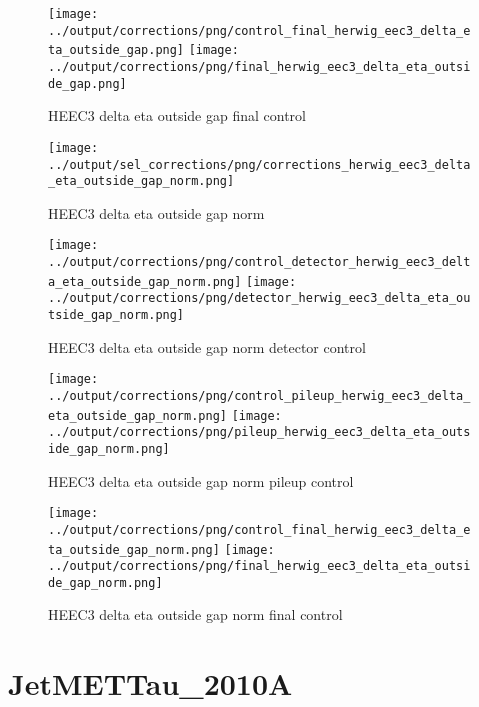 \documentclass[11pt]{book}
\begin{document}
\begin{figure}[ht]
\centering
\texttt{[image: ../output/corrections/png/control\_final\_herwig\_eec3\_delta\_eta\_outside\_gap.png]}
\texttt{[image: ../output/corrections/png/final\_herwig\_eec3\_delta\_eta\_outside\_gap.png]}
\caption{HEEC3 delta eta outside gap final control}
\label{fig:HEEC3_delta_etat_outside_gap_final_control}
\end{figure}


\begin{figure}[ht]
\centering
\texttt{[image: ../output/sel\_corrections/png/corrections\_herwig\_eec3\_delta\_eta\_outside\_gap\_norm.png]}
\caption{HEEC3 delta eta outside gap norm}
\label{fig:HEEC3_delta_eta_outside_gap_norm}
\end{figure}


\begin{figure}[ht]
\centering
\texttt{[image: ../output/corrections/png/control\_detector\_herwig\_eec3\_delta\_eta\_outside\_gap\_norm.png]}
\texttt{[image: ../output/corrections/png/detector\_herwig\_eec3\_delta\_eta\_outside\_gap\_norm.png]}
\caption{HEEC3 delta eta outside gap norm detector control}
\label{fig:HEEC3_delta_eta_outside_gap_norm_detector_control}
\end{figure}

\begin{figure}[ht]
\centering
\texttt{[image: ../output/corrections/png/control\_pileup\_herwig\_eec3\_delta\_eta\_outside\_gap\_norm.png]}
\texttt{[image: ../output/corrections/png/pileup\_herwig\_eec3\_delta\_eta\_outside\_gap\_norm.png]}
\caption{HEEC3 delta eta outside gap norm pileup control}
\label{fig:HEEC3_delta_eta_outside_gap_norm_pileup_control}
\end{figure}


\begin{figure}[ht]
\centering
\texttt{[image: ../output/corrections/png/control\_final\_herwig\_eec3\_delta\_eta\_outside\_gap\_norm.png]}
\texttt{[image: ../output/corrections/png/final\_herwig\_eec3\_delta\_eta\_outside\_gap\_norm.png]}
\caption{HEEC3 delta eta outside gap norm final control}
\label{fig:HEEC3_delta_etat_outside_gap_norm_final_control}
\end{figure}

\clearpage

\section{JetMETTau\_2010A}
\end{document}
